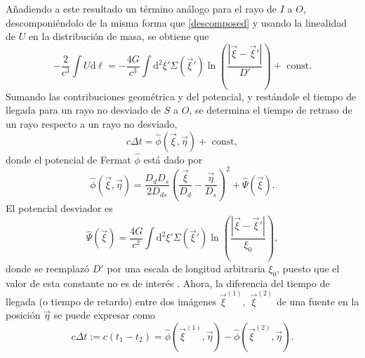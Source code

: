 Añadiendo a este resultado un término análogo para el rayo de $I$ a $O$, descomponiéndolo de la misma forma que \eqref{descomposed} y usando la linealidad de $U$ en la distribución de masa, se obtiene que
\begin{equation}
-\frac{2}{c^3}\int U \mathrm{d}\ell =- \frac{4G}{c^3}\int \mathrm{d}^2\xi' \Sigma(\vec{\xi}')\mathop{ln} \left( \frac{|\vec{\xi}-\vec{\xi}'|}{D'}\right)+ \text{ const}.
\end{equation}
Sumando las contribuciones geométrica y del potencial, y restándole el tiempo de llegada para un rayo no desviado de $S$ a $O$, se determina el tiempo de retraso de un rayo respecto a un rayo no desviado,
\begin{equation}
	c\Delta t = \hat{\phi}(\vec{\xi}, \vec{\eta})+\text{ const},
\end{equation} 
donde el potencial de Fermat $\hat{\phi}$ está dado por
\begin{equation}
	\hat{\phi}(\vec{\xi},\vec{\eta})= \frac{D_dD_s}{2D_{ds}}\left(\frac{\vec{\xi}}{D_d}-\frac{\vec{\eta}}{D_s} \right)^2+\hat{\Psi}(\vec{\xi}).
\end{equation}
El potencial desviador es
\begin{equation}
	\hat{\Psi}(\vec{\xi})=\frac{4G}{c^2}\int \mathrm{d}^2\xi' \Sigma(\vec{\xi}') \mathop{ln}\left( \frac{|\vec{\xi}-\vec{\xi}'|}{\xi_0} \right),
\end{equation}
donde se reemplazó $D'$ por una escala de longitud arbitraria $\xi_0$, puesto que el valor de esta constante no es de interés \cite{schneider_ehlers_falco_1992}. Ahora, la diferencia del tiempo de llegada (o tiempo de retardo) entre dos imágenes $\vec{\xi}^{(1)},$ $\vec{\xi}^{(2)}$ de una fuente en la posición $\vec{\eta}$ se puede expresar como
\begin{equation}
	c\Delta t:=c(t_1-t_2) = \hat{\phi}(\vec{\xi}^{(1)},\vec{\eta})- \hat{\phi}(\vec{\xi}^{(2)},\vec{\eta}).
\end{equation}